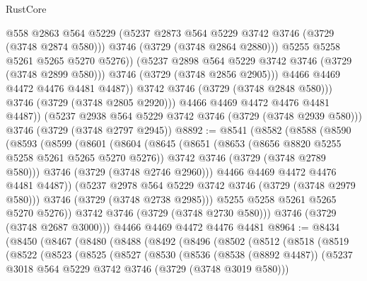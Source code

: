 \begin{lexlean}{RustCore}
\begin{coremodule}
                        @558
                        @2863
                        @564
                        @5229
                        (@5237 @2873 @564 @5229 @3742 @3746 (@3729 (@3748 @2874 @580)))
                        @3746
                        (@3729 (@3748 @2864 @2880)))
                      @5255
                      @5258
                      @5261
                      @5265
                      @5270
                      @5276))
                  (@5237 @2898 @564 @5229 @3742 @3746 (@3729 (@3748 @2899 @580)))
                  @3746
                  (@3729 (@3748 @2856 @2905)))
                @4466
                @4469
                @4472
                @4476
                @4481
                @4487))
            @3742
            @3746
            (@3729 (@3748 @2848 @580)))
          @3746
          (@3729 (@3748 @2805 @2920)))
        @4466
        @4469
        @4472
        @4476
        @4481
        @4487))
    (@5237 @2938 @564 @5229 @3742 @3746 (@3729 (@3748 @2939 @580)))
    @3746
    (@3729 (@3748 @2797 @2945))
@8892 := @8541
    (@8582
      (@8588
        (@8590
          (@8593
            (@8599
              (@8601
                (@8604
                  (@8645
                    (@8651
                      (@8653 (@8656 @8820 @5255 @5258 @5261 @5265 @5270 @5276))
                      @3742
                      @3746
                      (@3729 (@3748 @2789 @580)))
                    @3746
                    (@3729 (@3748 @2746 @2960)))
                  @4466
                  @4469
                  @4472
                  @4476
                  @4481
                  @4487))
              (@5237 @2978 @564 @5229 @3742 @3746 (@3729 (@3748 @2979 @580)))
              @3746
              (@3729 (@3748 @2738 @2985)))
            @5255
            @5258
            @5261
            @5265
            @5270
            @5276))
        @3742
        @3746
        (@3729 (@3748 @2730 @580)))
      @3746
      (@3729 (@3748 @2687 @3000)))
    @4466
    @4469
    @4472
    @4476
    @4481
@8964 := @8434
    (@8450
      (@8467
        (@8480
          (@8488
            (@8492
              (@8496
                (@8502
                  (@8512
                    (@8518
                      (@8519
                        (@8522
                          (@8523
                            (@8525
                              (@8527
                                (@8530
                                  (@8536
                                    (@8538 (@8892 @4487))
                                    (@5237 @3018 @564 @5229 @3742 @3746 (@3729 (@3748 @3019 @580)))

\end{coremodule}
\end{lexlean}
